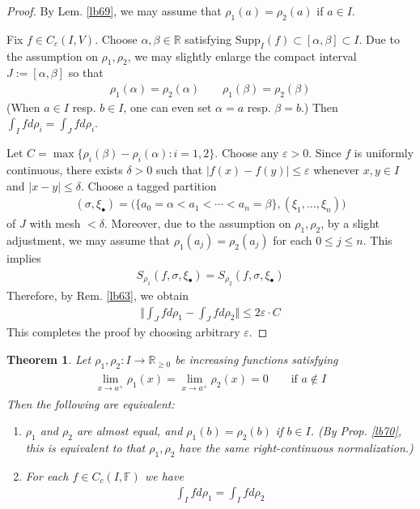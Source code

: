 \documentclass[12pt,b5paper,notitlepage]{article}
\theoremstyle{definition}
\theoremstyle{plain}
\newtheorem{thm}[df]{Theorem}
\newcommand{\blt}{\bullet}
\newcommand{\Rbb}{\mathbb R}
\newcommand{\Supp}{\mathrm{Supp}}
\newcommand{\Fbb}{\mathbb F}
\newcommand{\eps}{\varepsilon}
\numberwithin{equation}{section}
\begin{document}
\begin{proof}
By Lem. \ref{lb69}, we may assume that $\rho_1(a)=\rho_2(a)$ if $a\in I$. 

Fix $f\in C_c(I,V)$. Choose $\alpha,\beta\in\Rbb$ satisfying $\Supp_I(f)\subset[\alpha,\beta]\subset I$. Due to the assumption on $\rho_1,\rho_2$, we may slightly enlarge the compact interval $J:=[\alpha,\beta]$ so that
\begin{align*}
\rho_1(\alpha)=\rho_2(\alpha)\qquad \rho_1(\beta)=\rho_2(\beta)
\end{align*}
(When $a\in I$ resp. $b\in I$, one can even set $\alpha=a$ resp. $\beta=b$.) Then $\int_I fd\rho_i=\int_J fd\rho_i$.


Let $C=\max\{\rho_i(\beta)-\rho_i(\alpha):i=1,2\}$. Choose any $\eps>0$. Since $f$ is uniformly continuous, there exists $\delta>0$ such that $|f(x)-f(y)|\leq\eps$ whenever $x,y\in I$ and $|x-y|\leq\delta$. Choose a tagged partition
\begin{align*}
(\sigma,\xi_\blt)=\big(\{a_0=\alpha<a_1<\cdots<a_n=\beta\},(\xi_1,\dots,\xi_n) \big)
\end{align*}
of $J$ with mesh $<\delta$. Moreover, due to the assumption on $\rho_1,\rho_2$, by a slight adjustment, we may assume that $\rho_1(a_j)=\rho_2(a_j)$ for each $0\leq j\leq n$. This implies
\begin{align*}
S_{\rho_1}(f,\sigma,\xi_\blt)=S_{\rho_2}(f,\sigma,\xi_\blt)
\end{align*}
Therefore, by Rem. \ref{lb63}, we obtain
\begin{align*}
\Big\Vert \int_J fd\rho_1-\int_J fd\rho_2\big\Vert\leq 2\eps\cdot C
\end{align*}
This completes the proof by choosing arbitrary $\eps$.
\end{proof}


\begin{thm}\label{lb72}
Let $\rho_1,\rho_2:I\rightarrow\Rbb_{\geq0}$ be increasing functions satisfying
\begin{gather}\label{eq48}
\begin{gathered}
\lim_{x\rightarrow a^+}\rho_1(x)=\lim_{x\rightarrow a^+}\rho_2(x)=0\qquad\text{if }a\notin I
\end{gathered}
\end{gather}
Then the following are equivalent:
\begin{enumerate}[label=(\arabic*)]
\item $\rho_1$ and $\rho_2$ are almost equal, and $\rho_1(b)=\rho_2(b)$ if $b\in I$. (By Prop. \ref{lb70}, this is equivalent to that $\rho_1,\rho_2$ have the same right-continuous normalization.)
\item For each $f\in C_c(I,\Fbb)$ we have
\begin{align*}
\int_I fd\rho_1=\int_I fd\rho_2
\end{align*}
\end{enumerate}
\end{thm}
\end{document}
